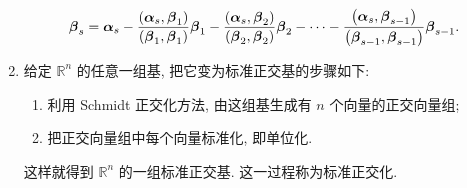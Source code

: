 \begin{theorem}
\begin{enumerate}[label=(\arabic{*})]
$$\begin{array}{l}
                      \vb*{\beta}_{s}=\vb*{\alpha}_{s}-\dfrac{\left(\vb*{\alpha}_{s}, \vb*{\beta}_{1}\right)}{\left(\vb*{\beta}_{1}, \vb*{\beta}_{1}\right)} \vb*{\beta}_{1}-\dfrac{\left(\vb*{\alpha}_{s}, \vb*{\beta}_{2}\right)}{\left(\vb*{\beta}_{2}, \vb*{\beta}_{2}\right)} \vb*{\beta}_{2}-\cdots-\dfrac{\left(\vb*{\alpha}_{s}, \vb*{\beta}_{s-1}\right)}{\left(\vb*{\beta}_{s-1}, \vb*{\beta}_{s-1}\right)} \vb*{\beta}_{s-1} .
                  \end{array}$$
        \item 给定 $ \mathbb{R}^{n} $ 的任意一组基, 把它变为标准正交基的步骤如下:
              \begin{enumerate}
                  \item 利用 Schmidt 正交化方法, 由这组基生成有 $ n $ 个向量的正交向量组;
                  \item 把正交向量组中每个向量标准化, 即单位化.
              \end{enumerate}
              这样就得到 $ \mathbb{R}^{n} $ 的一组标准正交基. 这一过程称为标准正交化.
    \end{enumerate}
\end{theorem}

